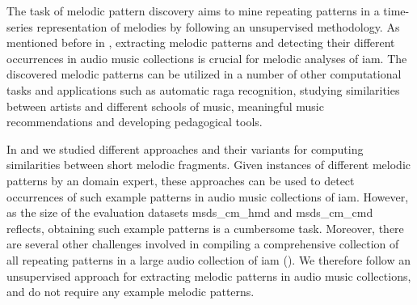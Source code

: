 The task of melodic pattern discovery aims to mine repeating patterns in a time-series representation of melodies by following an unsupervised methodology. As mentioned before in , extracting melodic patterns and detecting their different occurrences in audio music collections is crucial for melodic analyses of \gls{iam}. The discovered melodic patterns can be utilized in a number of other computational tasks and applications such as automatic \gls{raga} recognition, studying similarities between artists and different schools of music, meaningful music recommendations and developing pedagogical tools.

In  and  we studied different approaches and their variants for computing similarities between short melodic fragments. Given instances of different melodic patterns by an domain expert, these approaches can be used to detect occurrences of such example patterns in audio music collections of \gls{iam}. However, as the size of the evaluation datasets \acrshort{msds_cm_hmd} and \acrshort{msds_cm_cmd} reflects, obtaining such example patterns is a cumbersome task. Moreover, there are several other challenges involved in compiling a comprehensive collection of all repeating patterns in a large audio collection of \gls{iam} (). We therefore follow an unsupervised approach for extracting melodic patterns in audio music collections, and do not require any example melodic patterns. 


